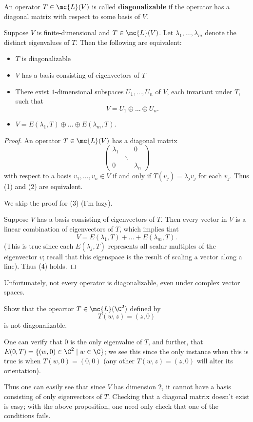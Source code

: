 \documentclass[math0540-lecture-notes.tex]{subfiles}
\begin{document}
\begin{definition}[Diagonalizable]{}
  An operator $T\in \mc{L}(V)$ is called \textbf{diagonalizable} if the operator has a diagonal
  matrix with respect to some basis of $V$.
\end{definition}
\begin{proposition}{}
  Suppose $V$ is finite-dimensional and $T\in \mc{L}(V)$. Let $\lambda_1,\ldots,\lambda_m$ denote
  the distinct eigenvalues of $T$. Then the following are equivalent:
  \begin{itemize}
    \item $T$ is diagonalizable
    \item $V$ has a basis consisting of eigenvectors of $T$
    \item There exist $1$-dimensional subspaces $U_1,\ldots,U_n$ of $V$, each invariant under $T$,
      such that \[
        V=U_1\oplus\ldots\oplus U_n
      .\] 
    \item $V=E(\lambda_1,T)\oplus\ldots\oplus E(\lambda_m,T)$.
  \end{itemize}
\end{proposition}
\begin{proof}[Proof]
  An operator $T\in \mc{L}(V)$ has a diagonal matrix \[
    \begin{pmatrix} \lambda_1& &0 \\ & \ddots & \\ 0 & & \lambda_n \end{pmatrix} 
  \] with respect to a basis $v_1,\ldots,v_n\in V$ if and only if $T(v_j)=\lambda_jv_j$ for each
  $v_j$. Thus (1) and (2) are equivalent.

  We skip the proof for (3) (I'm lazy).

  Suppose $V$ has a basis consisting of eigenvectors of $T$. Then every vector in $V$ is a linear
  combination of eigenvectors of $T$, which implies that \[
    V=E(\lambda_1,T)+\ldots+E(\lambda_m,T)
  .\] (This is true since each $E(\lambda_j,T)$ represents all scalar multiples of the eigenvector
  $v$; recall that this eigenspace is the result of scaling a vector along a line). Thus (4) holds.
\end{proof}

Unfortunately, not every operator is diagonalizable, even under complex vector spaces.
\begin{example}
  Show that the opeartor $T\in \mc{L}(\C^2)$ defined by \[
    T(w,z)=(z,0)
  \] is not diagonalizable.
  \begin{solution}
    One can verify that $0$ is the only eigenvalue of $T$, and further, that $E(0,T)=\{(w,0)\in
    \C^2\mid w\in \C\} $; we see this since the only instance when this is true is when
    $T(w,0)=(0,0)$ (any other $T(w,z)=(z,0)$ will alter its orientation).

    Thus one can easily see that since $V$ has dimension $2$, it cannot have a basis consisting of
    only eigenvectors of $T$. Checking that a diagonal matrix doesn't exist is easy; with the above
    proposition, one need only check that one of the conditions fails.
  \end{solution}
\end{example}
\end{document}
